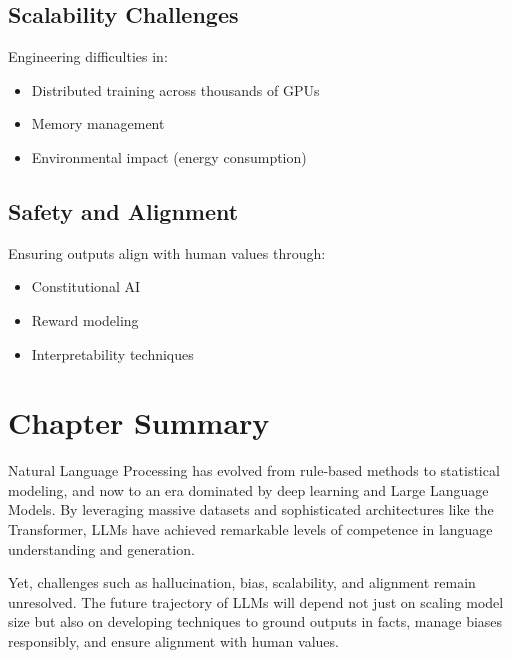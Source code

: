 \documentclass[openany]{book}
\begin{document}
\subsection{Scalability Challenges}
Engineering difficulties in:
\begin{itemize}
    \item Distributed training across thousands of GPUs
    \item Memory management
    \item Environmental impact (energy consumption)
\end{itemize}

\subsection{Safety and Alignment}
Ensuring outputs align with human values through:
\begin{itemize}
    \item Constitutional AI
    \item Reward modeling
    \item Interpretability techniques
\end{itemize}

\section{Chapter Summary}

Natural Language Processing has evolved from rule-based methods to statistical
modeling, and now to an era dominated by deep learning and Large Language 
Models. By leveraging massive datasets and sophisticated architectures like 
the Transformer, LLMs have achieved remarkable levels of competence in language 
understanding and generation.

Yet, challenges such as hallucination, bias, scalability, and alignment remain 
unresolved. The future trajectory of LLMs will depend not just on scaling model 
size but also on developing techniques to ground outputs in facts, manage biases 
responsibly, and ensure alignment with human values.
\end{document}
